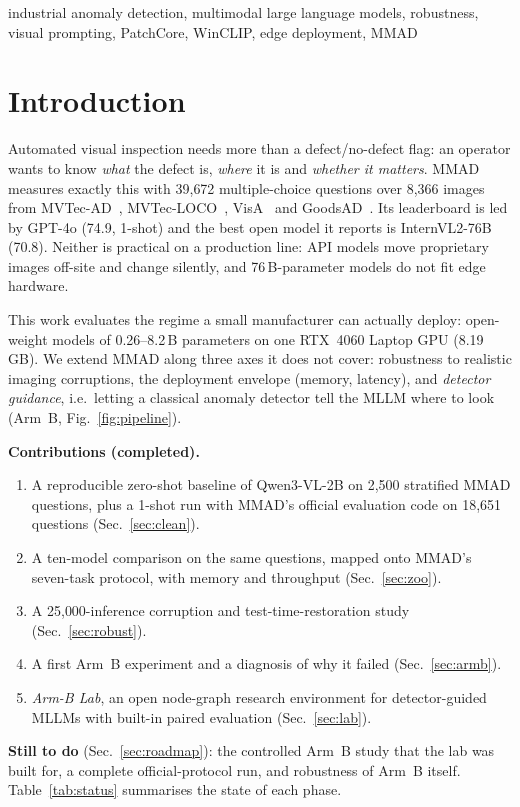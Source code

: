 \documentclass[conference]{IEEEtran}
\newcommand{\armB}{Arm~B}
\begin{document}
\begin{IEEEkeywords}
industrial anomaly detection, multimodal large language models, robustness,
visual prompting, PatchCore, WinCLIP, edge deployment, MMAD
\end{IEEEkeywords}

\section{Introduction}

Automated visual inspection needs more than a defect/no-defect flag: an operator
wants to know \emph{what} the defect is, \emph{where} it is and \emph{whether it
matters}. MMAD~\cite{jiang2025mmad} measures exactly this with 39{,}672
multiple-choice questions over 8{,}366 images from MVTec-AD~\cite{bergmann2019mvtec},
MVTec-LOCO~\cite{bergmann2022loco}, VisA~\cite{zou2022visa} and
GoodsAD~\cite{zhang2024goodsad}. Its leaderboard is led by GPT-4o (74.9, 1-shot) and
the best open model it reports is InternVL2-76B (70.8). Neither is practical on a
production line: API models move proprietary images off-site and change silently,
and 76\,B-parameter models do not fit edge hardware.

This work evaluates the regime a small manufacturer can actually deploy: open-weight
models of 0.26--8.2\,B parameters on one RTX~4060 Laptop GPU (8.19\,GB). We extend
MMAD along three axes it does not cover: robustness to realistic imaging
corruptions, the deployment envelope (memory, latency), and \emph{detector
guidance}, i.e.\ letting a classical anomaly detector tell the MLLM where to look
(\armB, Fig.~\ref{fig:pipeline}).

\textbf{Contributions (completed).}
\begin{enumerate}
  \item A reproducible zero-shot baseline of Qwen3-VL-2B on 2{,}500 stratified MMAD
        questions, plus a 1-shot run with MMAD's official evaluation code on
        18{,}651 questions (Sec.~\ref{sec:clean}).
  \item A ten-model comparison on the same questions, mapped onto MMAD's seven-task
        protocol, with memory and throughput (Sec.~\ref{sec:zoo}).
  \item A 25{,}000-inference corruption and test-time-restoration study
        (Sec.~\ref{sec:robust}).
  \item A first \armB{} experiment and a diagnosis of why it failed
        (Sec.~\ref{sec:armb}).
  \item \emph{Arm-B Lab}, an open node-graph research environment for
        detector-guided MLLMs with built-in paired evaluation
        (Sec.~\ref{sec:lab}).
\end{enumerate}
\textbf{Still to do} (Sec.~\ref{sec:roadmap}): the controlled \armB{} study that the
lab was built for, a complete official-protocol run, and robustness of \armB{}
itself. Table~\ref{tab:status} summarises the state of each phase.
\end{document}
